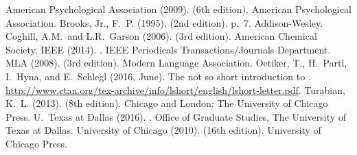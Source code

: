 \documentclass[doublespacing]{utdthesis}
\begin{document}
\begin{thesisbib}
  \begin{thebibliography}{}
  American Psychological Association (2009).
    (6th edition).
  \newblock American Psychological Association.
  {Brooks, Jr.}, F.~P. (1995).
   (2nd edition). p.~7.
  \newblock Addison-Wesley.
  Coghill, A.M.~and L.R.~Garson (2006).
   (3rd edition).
  \newblock American Chemical Society.
  IEEE (2014).
  .
  \newblock IEEE Periodicals Transactions/Journals Department.
  MLA (2008).
    (3rd edition).
  \newblock Modern Language Association.
  Oetiker, T., H.~Partl, I.~Hyna, and E.~Schlegl (2016, June).
  \newblock The not so short introduction to {\LaTeXe}.
  \newblock
    \url{http://www.ctan.org/tex-archive/info/lshort/english/lshort-letter.pdf}.
  Turabian, K.~L. (2013).
   (8th edition).
  \newblock Chicago and London: The University of Chicago Press.
  {U.~Texas at Dallas} (2016).
  .
  \newblock Office of Graduate Studies, The University of Texas at Dallas.
  University of Chicago (2010).
   (16th edition).
  \newblock University of Chicago Press.
  \end{thebibliography}

\end{thesisbib}  %
\end{document}
